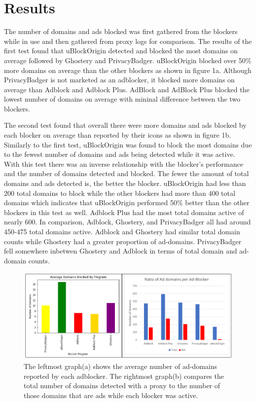 \documentclass[sigsmall]{acmart}
\begin{document}
\section*{Results}
The number of domains and ads blocked was first gathered from the blockers while in use and then gathered from proxy logs for comparison. The results of the first test found that uBlockOrigin detected and blocked the most domains on average followed by Ghostery and PrivacyBadger. uBlockOrigin blocked over 50\% more domains on average than the other blockers as shown in figure 1a. Although PrivacyBadger is not marketed as an adblocker, it blocked more domains on average than Adblock and Adblock Plus. 
AdBlock and AdBlock Plus blocked the lowest number of domains on average with mininal difference between the two blockers.  
 
The second test found that overall there were more domains and ads blocked by each blocker on average than reported by their icons as shown in figure 1b. Similarly to the first test, uBlockOrigin was found to block the most domains due to the fewest number of domains and ads being detected while it was active. With this test there was an inverse relationship with the blocker's performance and the number of domains detected and blocked. The fewer the amount of total domains and ads detected is, the better the blocker. uBlockOrigin had less than 200 total domains to block while the other blockers had more than 400 total domains which indicates that uBlockOrigin performed 50\% better than the other blockers in this test as well. Adblock Plus had the most total domains active of nearly 600. In comparison, Adblock, Ghostery, and PrivacyBadger all had around 450-475 total domains active. Adblock and Ghostery had similar total domain counts while Ghostery had a greater proportion of ad-domains. PrivacyBadger fell somewhere inbetwen Ghostery and Adblock in terms of total domain and ad-domain counts.   
\begin{figure}[h]
  \includegraphics[scale = 0.75]{Edit3.png}
  \caption{ The leftmost graph(a) shows the average number of ad-domains reported by each adblocker. The rightmost graph(b) compares the total number of domains detected with a proxy to the number of those domains that are ads while each blocker was active.}
  \label{fig:graph1ab}
\end{figure}
\end{document}
